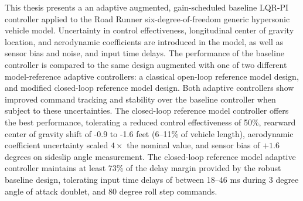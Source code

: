 This thesis presents a an adaptive augmented, gain-scheduled baseline LQR-PI controller applied to the Road Runner six-degree-of-freedom generic hypersonic vehicle model.
Uncertainty in control effectiveness, longitudinal center of gravity location, and aerodynamic coefficients are introduced in the model, as well as sensor bias and noise, and input time delays.
The performance of the baseline controller is compared to the same design augmented with one of two different model-reference adaptive controllers: a classical open-loop reference model design, and modified closed-loop reference model design.
Both adaptive controllers show improved command tracking and stability over the baseline controller when subject to these uncertainties.
The closed-loop reference model controller offers the best performance, tolerating a reduced control effectiveness of 50\%, rearward center of gravity shift of -0.9 to -1.6 feet (6--11\% of vehicle length), aerodynamic coefficient uncertainty scaled $4\times$ the nominal value, and sensor bias of $+1.6$ degrees on sideslip angle measurement.
The closed-loop reference model adaptive controller maintains at least 73\% of the delay margin provided by the robust baseline design, tolerating input time delays of between 18--46 ms during 3 degree angle of attack doublet, and 80 degree roll step commands.
